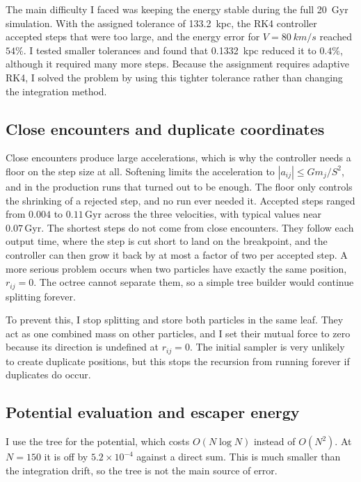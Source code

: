 \documentclass[12pt,a4paper]{article}
\begin{document}
The main difficulty I faced was keeping the energy stable during the full
\SI{20}{Gyr} simulation. With the assigned tolerance of \SI{133.2}{kpc}, the
RK4 controller accepted steps that were too large, and the energy error for
$V=\SI{80}{km/s}$ reached $54\%$. I tested smaller tolerances and found that
\SI{0.1332}{kpc} reduced it to $0.4\%$, although it required many more
steps. Because the
assignment requires adaptive RK4, I solved the problem by using this tighter
tolerance rather than changing the integration method.

\subsection{Close encounters and duplicate coordinates}

Close encounters produce large accelerations, which is why the controller needs
a floor on the step size at all. Softening limits the acceleration to
$|a_{ij}|\le Gm_j/S^2$, and in the production runs that turned out to be enough.
The floor only controls the shrinking of a rejected step, and no run ever needed
it. Accepted steps ranged from $0.004$ to $0.11\,\mathrm{Gyr}$ across the three
velocities, with typical values near $0.07\,\mathrm{Gyr}$. The shortest steps
do not come from close encounters. They follow each output time, where the step
is cut short to land on the breakpoint, and the controller can then grow it back
by at most a factor of two per accepted step. A
more serious problem occurs when two particles have exactly the same position,
$r_{ij}=0$. The octree cannot separate them, so a simple tree builder would
continue splitting forever.

To prevent this, I stop splitting and store both particles in the same leaf.
They act as one combined mass on other particles, and I set their mutual force
to zero because its direction is undefined at $r_{ij}=0$. The initial sampler is
very unlikely to create duplicate positions, but this stops the recursion from
running forever if duplicates do occur.

\subsection{Potential evaluation and escaper energy}

I use the tree for the potential, which costs $O(N\log N)$ instead of $O(N^2)$.
At $N=150$ it is off by $5.2\times10^{-4}$ against a direct sum. This is much
smaller than the integration drift, so the tree is not the main source of error.
\end{document}
